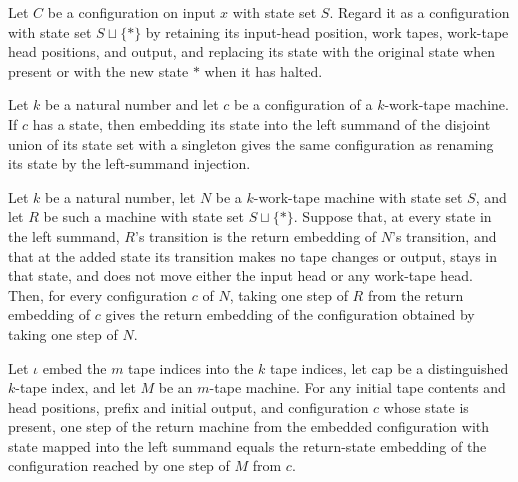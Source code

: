 \begin{definition}
\label{Turing.embedReturnCfg}
\leanok
{}
Let $C$ be a configuration on input $x$ with state set $S$. Regard it as a configuration
with state set $S\sqcup\{\ast\}$ by retaining its input-head position, work tapes,
work-tape head positions, and output, and replacing its state with the original state
when present or with the new state $\ast$ when it has halted.
\end{definition}

\begin{lemma}
\label{Turing.embedReturnCfg_live}
\leanok
{}
Let $k$ be a natural number and let $c$ be a configuration of a $k$-work-tape machine.
If $c$ has a state, then embedding its state into the left summand of the disjoint union
of its state set with a singleton gives the same configuration as renaming its state by
the left-summand injection.
\end{lemma}

\begin{lemma}
\label{Turing.embedReturn_step}
\leanok
{}
Let $k$ be a natural number, let $N$ be a $k$-work-tape machine with state set $S$, and
let $R$ be such a machine with state set $S \sqcup \{\ast\}$. Suppose that, at every
state in the left summand, $R$'s transition is the return embedding of $N$'s transition,
and that at the added state its transition makes no tape changes or output, stays in
that state, and does not move either the input head or any work-tape head. Then, for
every configuration $c$ of $N$, taking one step of $R$ from the return embedding of $c$
gives the return embedding of the configuration obtained by taking one step of $N$.
\end{lemma}

\begin{lemma}
\label{Turing.embedSilentRet_step}
\leanok
{}
Let $\iota$ embed the $m$ tape indices into the $k$ tape indices, let $\mathrm{cap}$ be
a distinguished $k$-tape index, and let $M$ be an $m$-tape machine. For any initial tape
contents and head positions, prefix and initial output, and configuration $c$ whose
state is present, one step of the return machine from the embedded configuration with
state mapped into the left summand equals the return-state embedding of the
configuration reached by one step of $M$ from $c$.
\end{lemma}

